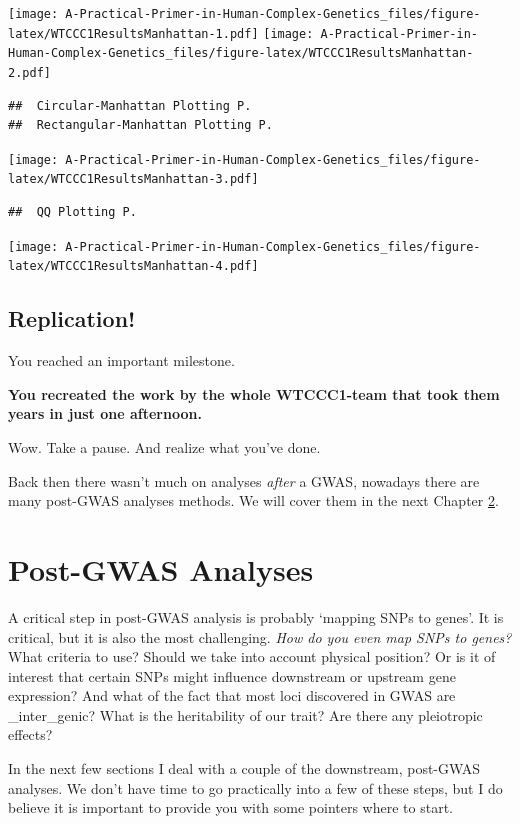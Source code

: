\documentclass[
]{book}
\begin{document}
\texttt{[image: A-Practical-Primer-in-Human-Complex-Genetics\_files/figure-latex/WTCCC1ResultsManhattan-1.pdf]} \texttt{[image: A-Practical-Primer-in-Human-Complex-Genetics\_files/figure-latex/WTCCC1ResultsManhattan-2.pdf]}

\begin{verbatim}
##  Circular-Manhattan Plotting P.
##  Rectangular-Manhattan Plotting P.
\end{verbatim}

\texttt{[image: A-Practical-Primer-in-Human-Complex-Genetics\_files/figure-latex/WTCCC1ResultsManhattan-3.pdf]}

\begin{verbatim}
##  QQ Plotting P.
\end{verbatim}

\texttt{[image: A-Practical-Primer-in-Human-Complex-Genetics\_files/figure-latex/WTCCC1ResultsManhattan-4.pdf]}

\hypertarget{replication}{%
\section{Replication!}\label{replication}}

You reached an important milestone.

\textbf{You recreated the work by the whole WTCCC1-team that took them years in just one afternoon.}

Wow. Take a pause. And realize what you've done.

Back then there wasn't much on analyses \emph{after} a GWAS, nowadays there are many post-GWAS analyses methods. We will cover them in the next Chapter \ref{post-gwas}.

\hypertarget{post-gwas}{%
\chapter{Post-GWAS Analyses}\label{post-gwas}}

A critical step in post-GWAS analysis is probably `mapping SNPs to genes'. It is critical, but it is also the most challenging. \emph{How do you even map SNPs to genes?} What criteria to use? Should we take into account physical position? Or is it of interest that certain SNPs might influence downstream or upstream gene expression? And what of the fact that most loci discovered in GWAS are \_inter\_genic? What is the heritability of our trait? Are there any pleiotropic effects?

In the next few sections I deal with a couple of the downstream, post-GWAS analyses. We don't have time to go practically into a few of these steps, but I do believe it is important to provide you with some pointers where to start.
\end{document}

